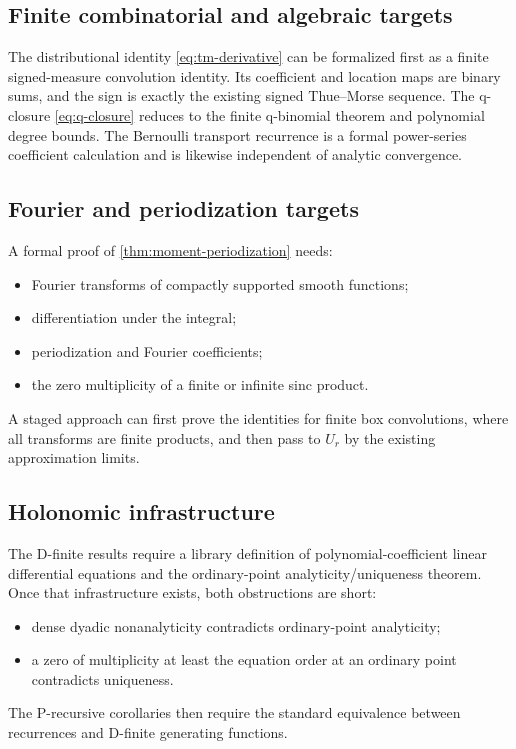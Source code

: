 \documentclass[11pt,oneside]{article}
\theoremstyle{definition}
\theoremstyle{remark}
\begin{document}
\subsection{Finite combinatorial and algebraic targets}
The distributional identity \eqref{eq:tm-derivative} can be formalized first as a finite signed-measure convolution identity.  Its coefficient and location maps are binary sums, and the sign is exactly the existing signed Thue--Morse sequence.  The q-closure \eqref{eq:q-closure} reduces to the finite q-binomial theorem and polynomial degree bounds.  The Bernoulli transport recurrence is a formal power-series coefficient calculation and is likewise independent of analytic convergence.

\subsection{Fourier and periodization targets}
A formal proof of \cref{thm:moment-periodization} needs:
\begin{itemize}
\item Fourier transforms of compactly supported smooth functions;
\item differentiation under the integral;
\item periodization and Fourier coefficients;
\item the zero multiplicity of a finite or infinite sinc product.
\end{itemize}
A staged approach can first prove the identities for finite box convolutions, where all transforms are finite products, and then pass to $U_r$ by the existing approximation limits.

\subsection{Holonomic infrastructure}
The D-finite results require a library definition of polynomial-coefficient linear differential equations and the ordinary-point analyticity/uniqueness theorem.  Once that infrastructure exists, both obstructions are short:
\begin{itemize}
\item dense dyadic nonanalyticity contradicts ordinary-point analyticity;
\item a zero of multiplicity at least the equation order at an ordinary point contradicts uniqueness.
\end{itemize}
The P-recursive corollaries then require the standard equivalence between recurrences and D-finite generating functions.
\end{document}
